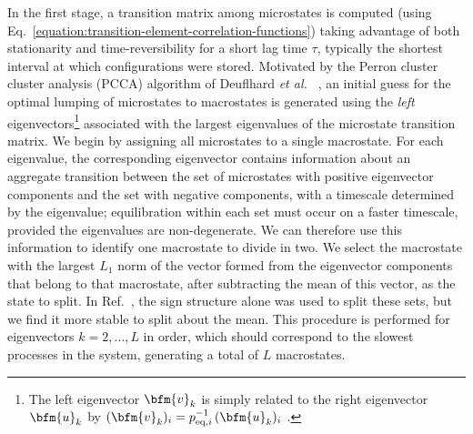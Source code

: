In the first stage, a transition matrix among microstates is computed (using Eq.\ \ref{equation:transition-element-correlation-functions}) taking advantage of both stationarity and time-reversibility for a short lag time $\tau$, typically the shortest interval at which configurations were stored.
Motivated by the Perron cluster cluster analysis (PCCA) algorithm of Deuflhard \emph{et al.\ } \cite{deuflhard:2000a}, an initial guess for the optimal lumping of microstates to macrostates is generated using the \emph{left} eigenvectors\footnote{The left eigenvector $\bfm{v}_k$ is simply related to the right eigenvector $\bfm{u}_k$ by $(\bfm{v}_k)_i = p_{\mathrm{eq},i}^{-1} \, (\bfm{u}_k)_i$ \cite{oppenheim:1977a}.} associated with the largest eigenvalues of the microstate transition matrix.
We begin by assigning all microstates to a single macrostate.
For each eigenvalue, the corresponding eigenvector contains information about an aggregate transition between the set of microstates with positive eigenvector components and the set with negative components, with a timescale determined by the eigenvalue; equilibration within each set must occur on a faster timescale, provided the eigenvalues are non-degenerate.
We can therefore use this information to identify one macrostate to divide in two.
We select the macrostate with the largest $L_1$ norm of the vector formed from the eigenvector components that belong to that macrostate, after subtracting the mean of this vector, as the state to split.
In Ref.\ \cite{deuflhard:2000a}, the sign structure alone was used to split these sets, but we find it more stable to split about the mean.
This procedure is performed for eigenvectors $k = 2,\ldots,L$ in order, which should correspond to the slowest processes in the system, generating a total of $L$ macrostates.

